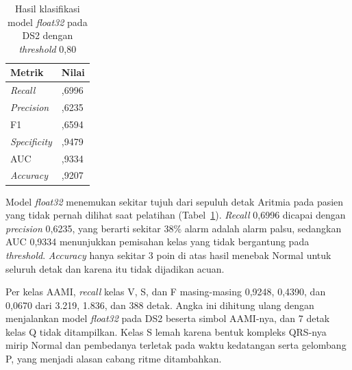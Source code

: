\begin{table}[!ht]
  \centering
  \caption{Hasil klasifikasi model \textit{float32} pada DS2 dengan \textit{threshold} 0,80}
  \label{tab:hasil-ds2}
  \setlength{\tabcolsep}{4pt}
  \renewcommand{\arraystretch}{1.15}
  \small
  \begin{tabular}{>{\RaggedRight\arraybackslash}p{4.4cm}>{\raggedleft\arraybackslash}p{2.2cm}}
    \toprule
    \textbf{Metrik} & \textbf{Nilai} \\
    \midrule
    \textit{Recall} & 0,6996 \\
    \textit{Precision} & 0,6235 \\
    F1 & 0,6594 \\
    \textit{Specificity} & 0,9479 \\
    AUC & 0,9334 \\
    \textit{Accuracy} & 0,9207 \\
    \bottomrule
  \end{tabular}
  \par{}
\end{table}

Model \textit{float32} menemukan sekitar tujuh dari sepuluh detak Aritmia pada pasien yang tidak pernah dilihat saat pelatihan (Tabel~\ref{tab:hasil-ds2}). \textit{Recall} 0,6996 dicapai dengan \textit{precision} 0,6235, yang berarti sekitar 38\% alarm adalah alarm palsu, sedangkan AUC 0,9334 menunjukkan pemisahan kelas yang tidak bergantung pada \textit{threshold}. \textit{Accuracy} hanya sekitar 3 poin di atas hasil menebak Normal untuk seluruh detak dan karena itu tidak dijadikan acuan.

Per kelas AAMI, \textit{recall} kelas V, S, dan F masing-masing 0,9248, 0,4390, dan 0,0670 dari 3.219, 1.836, dan 388 detak. Angka ini dihitung ulang dengan menjalankan model \textit{float32} pada DS2 beserta simbol AAMI-nya, dan 7 detak kelas Q tidak ditampilkan. Kelas S lemah karena bentuk kompleks QRS-nya mirip Normal dan pembedanya terletak pada waktu kedatangan serta gelombang P, yang menjadi alasan cabang ritme ditambahkan.

